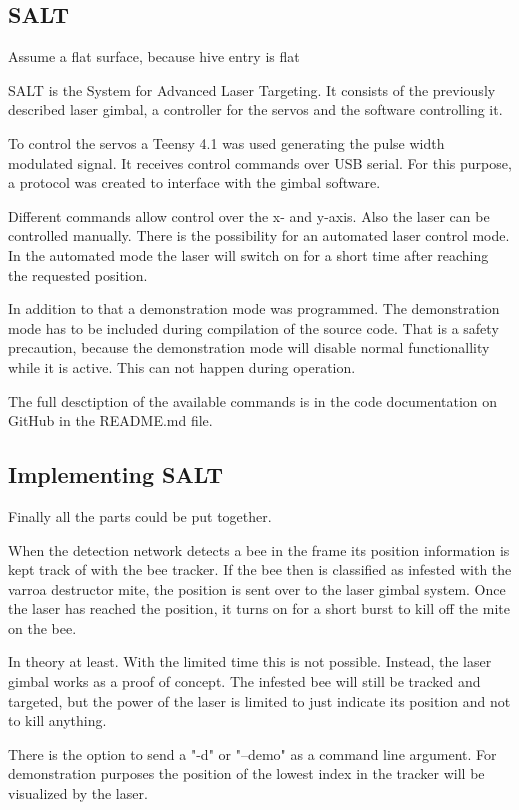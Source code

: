 \documentclass[a4paper,titlepage]{article}
\begin{document}
\newpage
\subsection{SALT}
Assume a flat surface, because hive entry is flat

SALT is the System for Advanced Laser Targeting.
It consists of the previously described laser gimbal, a controller for the servos and the software controlling it.

To control the servos a Teensy 4.1 was used generating the pulse width modulated signal.
It receives control commands over USB serial.
For this purpose, a protocol was created to interface with the gimbal software.

Different commands allow control over the x- and y-axis.
Also the laser can be controlled manually.
There is the possibility for an automated laser control mode.
In the automated mode the laser will switch on for a short time after reaching the requested position.

In addition to that a demonstration mode was programmed.
The demonstration mode has to be included during compilation of the source code.
That is a safety precaution, because the demonstration mode will disable normal functionallity while it is active.
This can not happen during operation.

The full desctiption of the available commands is in the code documentation on GitHub in the README.md file.

\subsection{Implementing SALT}

Finally all the parts could be put together.

When the detection network detects a bee in the frame its position information is kept track of with the bee tracker.
If the bee then is classified as infested with the varroa destructor mite, the position is sent over to the laser gimbal system.
Once the laser has reached the position, it turns on for a short burst to kill off the mite on the bee.

In theory at least.
With the limited time this is not possible.
Instead, the laser gimbal works as a proof of concept.
The infested bee will still be tracked and targeted, but the power of the laser is limited to just indicate its position and not to kill anything.

There is the option to send a "-d" or "--demo" as a command line argument.
For demonstration purposes the position of the lowest index in the tracker will be visualized by the laser.
\end{document}
